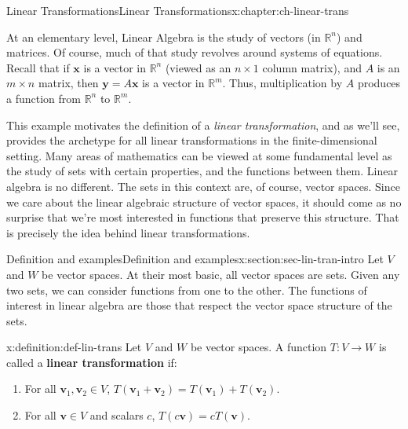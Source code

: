 \documentclass[oneside,10pt,]{book}
\newcommand{\terminology}[1]{\textbf{#1}}
\numberwithin{equation}{section}
\newcommand{\R}{\mathbb{R}}
\newcommand{\vv}{\mathbf{v}}
\newcommand{\xx}{\mathbf{x}}
\newcommand{\yy}{\mathbf{y}}
\begin{document}
%
%
\typeout{************************************************}
\typeout{************************************************}
%
\begin{chapterptx}{Linear Transformations}{}{Linear Transformations}{}{}{x:chapter:ch-linear-trans}
\begin{introduction}{}%
At an elementary level, Linear Algebra is the study of vectors (in \(\R^n\)) and matrices. Of course, much of that study revolves around systems of equations. Recall that if \(\xx\) is a vector in \(\R^n\) (viewed as an \(n\times 1\) column matrix), and \(A\) is an \(m\times n\) matrix, then \(\yy=A\xx\) is a vector in \(\R^m\). Thus, multiplication by \(A\) produces a function from \(\R^n\) to \(\R^m\).%
\par
This example motivates the definition of a \emph{linear transformation}, and as we'll see, provides the archetype for all linear transformations in the finite-dimensional setting. Many areas of mathematics can be viewed at some fundamental level as the study of sets with certain properties, and the functions between them. Linear algebra is no different. The sets in this context are, of course, vector spaces. Since we care about the linear algebraic structure of vector spaces, it should come as no surprise that we're most interested in functions that preserve this structure. That is precisely the idea behind linear transformations.%
\end{introduction}%
%
%
\typeout{************************************************}
\typeout{************************************************}
%
\begin{sectionptx}{Definition and examples}{}{Definition and examples}{}{}{x:section:sec-lin-tran-intro}
Let \(V\) and \(W\) be vector spaces. At their most basic, all vector spaces are sets. Given any two sets, we can consider functions from one to the other. The functions of interest in linear algebra are those that respect the vector space structure of the sets.%
\begin{definition}{}{x:definition:def-lin-trans}%
Let \(V\) and \(W\) be vector spaces. A function \(T:V\to W\) is called a \terminology{linear transformation} if:%
\begin{enumerate}
\item{}For all \(\vv_1,\vv_2\in V\), \(T(\vv_1+\vv_2)=T(\vv_1)+T(\vv_2)\).%
\item{}For all \(\vv\in V\) and scalars \(c\), \(T(c\vv)=cT(\vv)\).%
\end{enumerate}

\end{definition}
\end{sectionptx}
\end{chapterptx}
\end{document}
